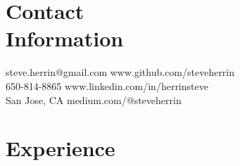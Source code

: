 \documentclass[margin,line]{resume}
\begin{document}
\begin{resume}

    \section{\mysidestyle Contact\\Information}

    steve.herrin@gmail.com		\hfill www.github.com/steveherrin		\vspace{0mm}\\\vspace{0mm}%
    650-814-8865				\hfill www.linkedin.com/in/herrinsteve		\vspace{0mm}\\\vspace{-4.5mm}%
    San Jose, CA    				\hfill medium.com/@steveherrin		\vspace{0mm}\\\vspace{0mm}%
    
    \section{\mysidestyle Experience}


\end{resume}
\end{document}
